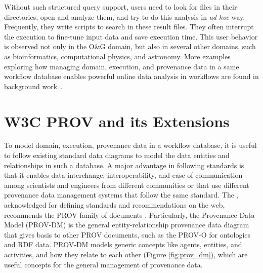Without such structured query support, users need to look for files in their directories, open and analyze them, and try to do this analysis in \textit{ad-hoc} way. Frequently, they write scripts to search in these result files.
They often interrupt the execution to fine-tune input data and save execution time. This user behavior is observed not only in the O\&G domain, but also in several other domains, such as bioinformatics, computational physics, and astronomy. More examples exploring how managing domain, execution, and provenance data in a same workflow database enables powerful online data analysis in workflows are found in background work~\cite{Costa2013Capturing,DeOliveira2015How,Souza2015Monitoramento,Silva2017Raw,silva_adding_2018}.







\section{W3C PROV and its Extensions}
\label{sub_w3cprov}


To model domain, execution, provenance data in a workflow database, it is useful to follow
existing standard data diagrams to model the data entities and relationships in such a database.
A major advantage in following standards is that it enables data interchange, interoperability, and ease of communication among scientists and engineers from different communities or that use different provenance data management systems that follow the same standard.
The , acknowledged for defining standards and recommendations on the web, recommends the PROV family of documents \cite{Groth2013W3C}. Particularly, the Provenance Data Model (PROV-DM) is the general entity-relationship provenance data diagram
that gives basis to other PROV documents, such as the PROV-O for ontologies and RDF data.
PROV-DM models generic concepts like agents, entities, and activities, and how they relate to each other (Figure \ref{fig:prov_dm}), which are useful concepts for the general management of provenance data.

